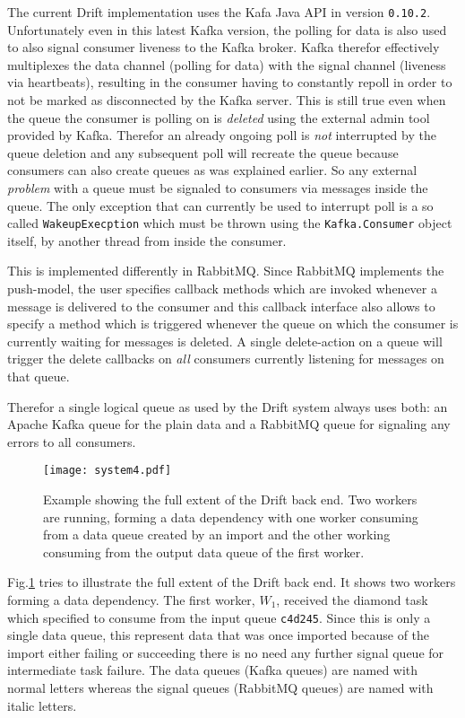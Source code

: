 The current Drift implementation uses the Kafa Java API in
version \texttt{0.10.2}.
Unfortunately even in this latest Kafka version, the polling for data is
also used to also signal consumer liveness to the Kafka broker.
Kafka therefor effectively multiplexes the data channel (polling for data)
with the signal channel (liveness via heartbeats), resulting
in the consumer having to constantly repoll in order to not
be marked as disconnected by the Kafka server.
This is still true even when the queue the consumer is polling
on is \textit{deleted} using the external admin tool provided
by Kafka. Therefor an already ongoing poll is \textit{not}
interrupted by the queue deletion and any subsequent poll will
recreate the queue because consumers can also create queues
as was explained earlier. So any external \textit{problem}
with a queue must be signaled to consumers via messages inside
the queue. The only exception that can currently be used to
interrupt poll is a so called \texttt{WakeupExecption} which
must be thrown using the \texttt{Kafka.Consumer} object itself,
by another thread from inside the consumer.
\newline

This is implemented differently in RabbitMQ. Since RabbitMQ
implements the push-model, the user specifies callback methods
which are invoked whenever a message is delivered to the
consumer and this callback interface also allows to specify
a method which is triggered whenever the queue on which the
consumer is currently waiting for messages is deleted.
A single delete-action on a queue will trigger the delete
callbacks on \textit{all} consumers currently listening for
messages on that queue.

Therefor a single logical queue as used by the Drift
system always uses both: an Apache Kafka queue for the plain
data and a RabbitMQ queue for signaling any errors to all
consumers.

\begin{figure}[h]
  \texttt{[image: system4.pdf]}
  \caption{Example showing the full extent of the Drift back end.
           Two workers are running, forming a data dependency with
           one worker consuming from a data queue created by an import
           and the other working consuming from the output data queue
           of the first worker.}
  \label{system4}
\end{figure}

Fig.\ref{system4} tries to illustrate the full extent of the
Drift back end. It shows two workers forming a data dependency.
The first worker, $W_{1}$, received the diamond task which specified
to consume from the input queue \texttt{c4d245}. Since this is only
a single data queue, this represent data that was once imported
because of the import either failing or succeeding there is no need
any further signal queue for intermediate task failure. The data queues
(Kafka queues) are named with normal letters whereas the signal
queues (RabbitMQ queues) are named with italic letters.

